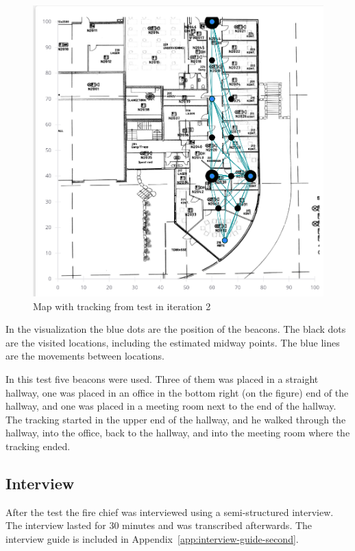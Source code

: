\documentclass[../Main/thesis.tex]{subfiles}
\begin{document}
\begin{figure}[h]
	\centering
	\includegraphics[width=\textwidth]{../fig/iteration2-map}
	\caption{Map with tracking from test in iteration 2}
	\label{fig:iteration2-map}
\end{figure}

In the visualization the blue dots are the position of the beacons.
The black dots are the visited locations, including the estimated midway points.
The blue lines are the movements between locations.

In this test five beacons were used. 
Three of them was placed in a straight hallway, one was placed in an office in the bottom right (on the figure) end of the hallway, and one was placed in a meeting room next to the end of the hallway.
The tracking started in the upper end of the hallway, and he walked through the hallway, into the office, back to the hallway, and into the meeting room where the tracking ended.

\subsection{Interview}
After the test the fire chief was interviewed using a semi-structured interview.
The interview lasted for 30 minutes and was transcribed afterwards.
The interview guide is included in Appendix~\ref{app:interview-guide-second}.
\end{document}
